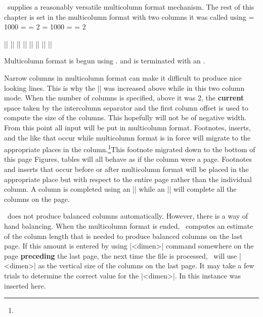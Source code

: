  \relax \fi %

\def\cqu{}

\intex\ supplies a reasonably versatile multicolumn format mechanism. 
The rest of this chapter is set in the multicolumn format with two columns it
was called using
\begintt
\beginmulticolumnformat
\tolerance = 1000
\intercolumnsep = {\quad \vrule\quad}
\numberofcolumns = 2
\endtt
\beginmulticolumnformat
\tolerance = 1000
\intercolumnsep = {\quad \vrule\quad}
\numberofcolumns = 2

\begingroup
\obeylines
\ext|\balancecolumnsize|
\ext|\beginmulticolumnformat|
\ext|\endmulticolumnformat|
\ext|\ejectcolumn|
\ext|\ejectpage|
\ext|\firstcolumnoffset|
\ext|\intercolumnsep|
\ext|\numberofcolumns|
\endgroup

Multicolumn format is begun using
\begintt
\beginmulticolumnformat.
\endtt
and is terminated with an
\begintt
\endmulticolumnformat. 
\endtt

Narrow columns in multicolumn format can make it difficult to produce nice
looking lines. This is why the |\tolerance| was increased above while in this
two column mode.
When the number of columns is specified,
above it was 2, the {\bf current} space taken by the intercolumn separator and the
first column offset is used to compute the size of the columns. This
hopefully will not be of negative width. From this point all input will be
put in multicolumn format. Footnotes, inserts, and the like that occur 
while multicolumn format is in force will migrate to the appropriate places
in the column.\footnote{\dagger}{This footnote migrated down to the bottom of
this page} Figures, tables will all behave as if the column were a page.
Footnotes and inserts that occur before or after multicolumn format will be
placed in the appropriate place but with  respect to the entire page rather
than the individual column. A column is completed using an |\ejectcolumn|
while an |\ejectpage| will complete all the columns on the page. 

\intex\ does not produce balanced columns automatically.
However, there is a way of hand
balancing. When the multicolumn format is ended, \intex\ computes
an estimate of the column length that is needed to produce balanced
columns on the last page. If this amount is entered by using 
|\balancecolumnsize [=] <dimen>| command somewhere on the page {\bf
preceding} the last page, the next time the file is processed, \intex\ will
use |<dimen>| as the vertical size of the columns on the last
page. It may take a few trials to determine the correct value for the
|<dimen>|. In this instance 
\begintt
\balancecolumnsize=165pt
\endtt
was inserted here.
\balancecolumnsize=165pt


